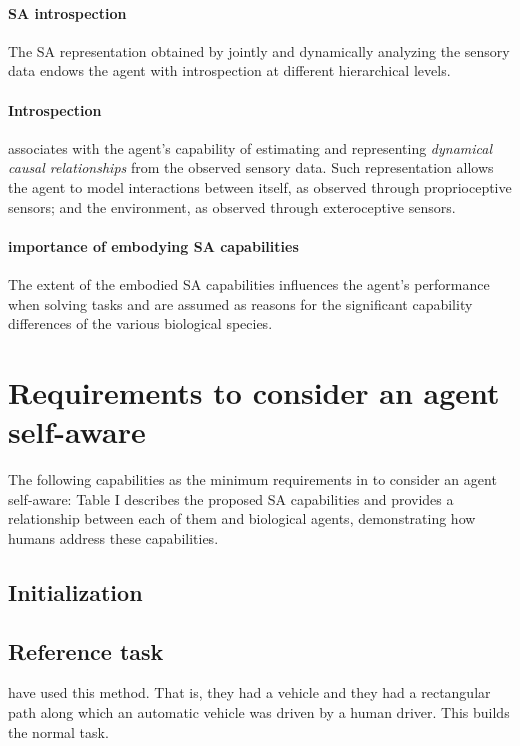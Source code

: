 \documentclass{article}
\begin{document}
		\paragraph{SA introspection}  The SA representation obtained by jointly and dynamically analyzing the sensory data endows the agent with introspection at different hierarchical levels.
		
		\paragraph{Introspection} associates with the agent’s capability of estimating and representing \emph{dynamical causal relationships} from the observed sensory data. Such representation allows the agent to model interactions between itself, as observed through proprioceptive
		sensors; and the environment, as observed through exteroceptive sensors.
		
		\paragraph{importance of embodying SA capabilities}The extent of the embodied SA capabilities influences the agent's performance when solving tasks and are assumed as reasons for the significant capability differences of the various biological species. 
		
		\section{Requirements to consider an agent self-aware}The following capabilities as the minimum requirements in to consider an agent self-aware:
			\citet{regazzoni-2020-multi-sensorial-generative-and-descriptive-self-awareness-models-for-autonomous-systems} Table I describes the proposed SA capabilities and provides a relationship between each of them and biological agents, demonstrating how humans address these capabilities.
			\subsection{Initialization}
				\subsection{Reference task} \cite{regazzoni-2020-multi-sensorial-generative-and-descriptive-self-awareness-models-for-autonomous-systems,kanapram-2019-dynamic-bayesian-approach-for-decision-making-in-ego-things,kanapram-2019-self-awareness-in-intelligent-vehicles-experience-based-abnormality-detection,kanapram-2020-collective-awareness-for-abnormality-detection-in-connected-autonomous-vehicles,baydoun-2018-learning-switching-models-for-abnormality-detection-for-autonomous-driving} have used this method. That is, they had a vehicle and they had a rectangular path along which an automatic vehicle was driven by a human driver. This builds the normal task. 
\end{document}
